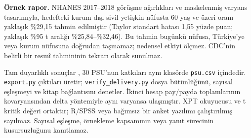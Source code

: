 \begin{researchbox}
\textbf{Örnek rapor.} NHANES 2017--2018 görüşme ağırlıkları ve
maskelenmiş varyans tasarımıyla, hedefteki kurum dışı sivil yetişkin
nüfusta 60 yaş ve üzeri oranı yaklaşık \%29,15 tahmin edilmiştir
(Taylor standart hatası 1,55 yüzde puan; yaklaşık \%95 t aralığı
\%25,84--\%32,46). Bu tahmin bugünkü nüfusa, Türkiye'ye veya kurum
nüfusuna doğrudan taşınamaz; nedensel etkiyi ölçmez. CDC'nin belirli
bir resmî tahmininin tekrarı olarak sunulmaz.
\end{researchbox}

\begin{softwarebox}
Tam duyarlıklı sonuçlar ,
30 PSU'nun katkıları aynı klasörde \texttt{psu.csv} içindedir.
\texttt{export.py} çıktıları üretir; \texttt{verify\_delivery.py}
dosya bütünlüğünü, sayısal eşleşmeyi ve kitap bağlantısını denetler.
İkinci hesap pay/payda toplamlarının kovaryansından delta yöntemiyle
aynı varyansa ulaşmıştır. XPT okuyucusu ve t kritik değeri ortaktır;
R/SPSS veya bağımsız bir anket yazılımı çalıştırılmış sayılmaz.
Sayısal eşleşme, örnekleme kapsamının veya yanıt sürecinin kusursuzluğunu
kanıtlamaz.
\end{softwarebox}